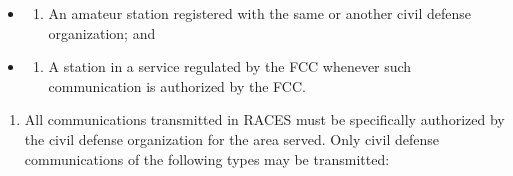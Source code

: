 \documentclass[
  letterpaper,
  DIV=11,
  numbers=noendperiod]{scrreport}
\providecommand{\tightlist}{%
  \setlength{\itemsep}{0pt}\setlength{\parskip}{0pt}}\usepackage{longtable,booktabs,array}
\begin{document}
\begin{itemize}
\item
  \begin{enumerate}
  \def\labelenumi{(\arabic{enumi})}
  \tightlist
  \item
    An amateur station registered with the same or another civil defense
    organization; and
  \end{enumerate}
\item
  \begin{enumerate}
  \def\labelenumi{(\arabic{enumi})}
  \setcounter{enumi}{1}
  \tightlist
  \item
    A station in a service regulated by the FCC whenever such
    communication is authorized by the FCC.
  \end{enumerate}
\end{itemize}

\begin{enumerate}
\def\labelenumi{(\alph{enumi})}
\setcounter{enumi}{3}
\tightlist
\item
  All communications transmitted in RACES must be specifically
  authorized by the civil defense organization for the area served. Only
  civil defense communications of the following types may be
  transmitted:
\end{enumerate}
\end{document}
